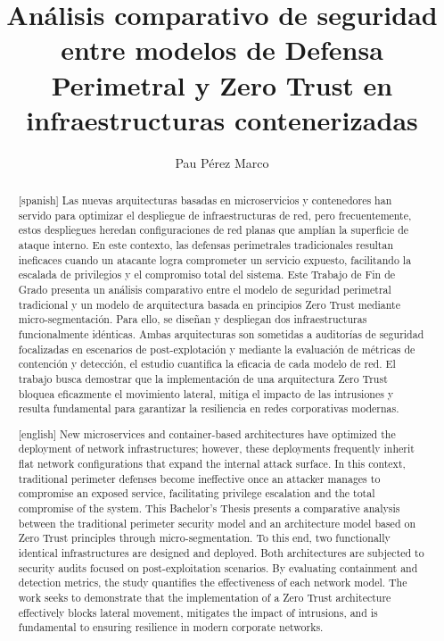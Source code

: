 \documentclass[11pt,spanish,listoffigures,listoftables]{tfgetsinf}
\title{Análisis comparativo de seguridad entre modelos de Defensa Perimetral y Zero Trust en infraestructuras contenerizadas}
\author{Pau Pérez Marco}
\begin{document}

\begin{abstract}[spanish]
Las nuevas arquitecturas basadas en microservicios y contenedores han servido para optimizar el despliegue de infraestructuras de red, pero frecuentemente, estos despliegues heredan configuraciones de red planas que amplían la superficie de ataque interno. En este contexto, las defensas perimetrales tradicionales resultan ineficaces cuando un atacante logra comprometer un servicio expuesto, facilitando la escalada de privilegios y el compromiso total del sistema. Este Trabajo de Fin de Grado presenta un análisis comparativo entre el modelo de seguridad perimetral tradicional y un modelo de arquitectura basada en principios Zero Trust mediante micro-segmentación. Para ello, se diseñan y despliegan dos infraestructuras funcionalmente idénticas. Ambas arquitecturas son sometidas a auditorías de seguridad focalizadas en escenarios de post-explotación y mediante la evaluación de métricas de contención y detección, el estudio cuantifica la eficacia de cada modelo de red. El trabajo busca demostrar que la implementación de una arquitectura Zero Trust bloquea eficazmente el movimiento lateral, mitiga el impacto de las intrusiones y resulta fundamental para garantizar la resiliencia en redes corporativas modernas.
\end{abstract}

\begin{abstract}[english]
New microservices and container-based architectures have optimized the deployment of network infrastructures; however, these deployments frequently inherit flat network configurations that expand the internal attack surface. In this context, traditional perimeter defenses become ineffective once an attacker manages to compromise an exposed service, facilitating privilege escalation and the total compromise of the system. This Bachelor's Thesis presents a comparative analysis between the traditional perimeter security model and an architecture model based on Zero Trust principles through micro-segmentation. To this end, two functionally identical infrastructures are designed and deployed. Both architectures are subjected to security audits focused on post-exploitation scenarios. By evaluating containment and detection metrics, the study quantifies the effectiveness of each network model. The work seeks to demonstrate that the implementation of a Zero Trust architecture effectively blocks lateral movement, mitigates the impact of intrusions, and is fundamental to ensuring resilience in modern corporate networks.
\end{abstract}
\end{document}

